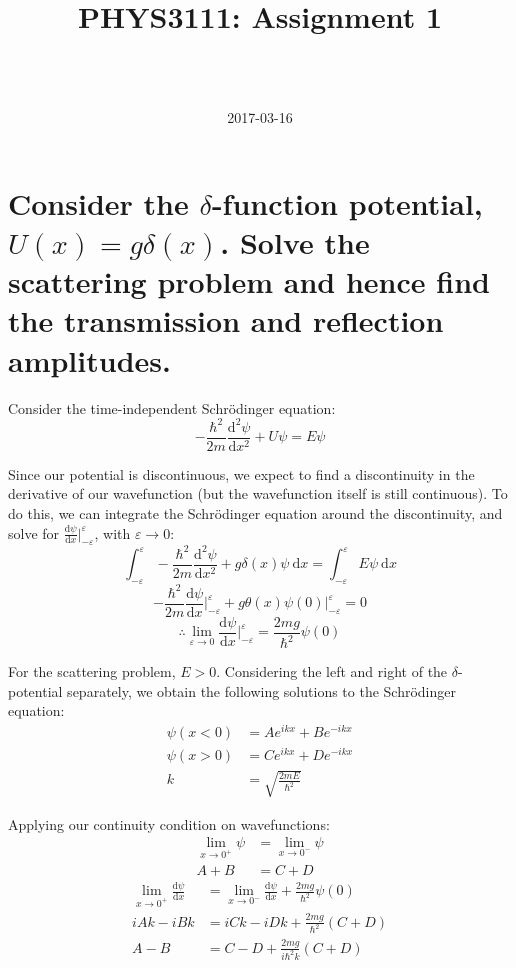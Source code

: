 \documentclass[a4paper]{scrartcl}
\begin{document}
\title{PHYS3111: Assignment 1}
\author{ \\ \\ }
\date{2017-03-16}
\maketitle

\section{Consider the \(\delta\)-function potential, \(U(x) = g \delta(x)\). Solve the scattering problem and hence find the transmission and reflection amplitudes.}
Consider the time-independent Schr\"odinger equation:
\[-\frac{\hbar^2}{2 m} \frac{\mathrm{d}^2 \psi}{\mathrm{d} x^2} + U \psi = E \psi\]

Since our potential is discontinuous, we expect to find a discontinuity in the derivative of our wavefunction (but the wavefunction itself is still continuous). To do this, we can integrate the Schr\"odinger equation around the discontinuity, and solve for \(\frac{\mathrm{d} \psi}{\mathrm{d} x} \big|_{-\varepsilon}^{\varepsilon}\), with \(\varepsilon \to 0\):
\[\int_{-\varepsilon}^{\varepsilon} -\frac{\hbar^2}{2 m} \frac{\mathrm{d}^2 \psi}{\mathrm{d} x^2} + g \delta(x) \psi \:\mathrm{d} x = \int_{-\varepsilon}^{\varepsilon} E \psi \:\mathrm{d} x\]
\[-\frac{\hbar^2}{2 m} \frac{\mathrm{d} \psi}{\mathrm{d} x} \bigg|_{-\varepsilon}^{\varepsilon} + g \theta(x) \psi(0) \bigg|_{-\varepsilon}^{\varepsilon} = 0\]
\[\therefore \lim_{\varepsilon \to 0} \frac{\mathrm{d} \psi}{\mathrm{d} x} \bigg|_{-\varepsilon}^{\varepsilon} = \frac{2 m g}{\hbar^2} \psi(0)\]

For the scattering problem, \(E > 0\). Considering the left and right of the \(\delta\)-potential separately, we obtain the following solutions to the Schr\"odinger equation:
\begin{align*}
    \psi(x < 0) &= A e^{i k x} + B e^{-i k x} \\
    \psi(x > 0) &= C e^{i k x} + D e^{-i k x} \\
    k &= \sqrt{\frac{2 m E}{\hbar^2}}
\end{align*}

Applying our continuity condition on wavefunctions:
\begin{align*}
    \lim_{x \to 0^+} \psi &= \lim_{x \to 0^-} \psi \\
    A + B &= C + D
\end{align*}
\begin{align*}
    \lim_{x \to 0^+} \frac{\mathrm{d} \psi}{\mathrm{d} x} &= \lim_{x \to 0^-} \frac{\mathrm{d} \psi}{\mathrm{d} x} + \frac{2 m g}{\hbar^2} \psi(0) \\
    i A k - i B k &= i C k - i D k + \frac{2 m g}{\hbar^2} (C + D) \\
    A - B &= C - D + \frac{2 m g}{i \hbar^2 k} (C + D)
\end{align*}
\end{document}
